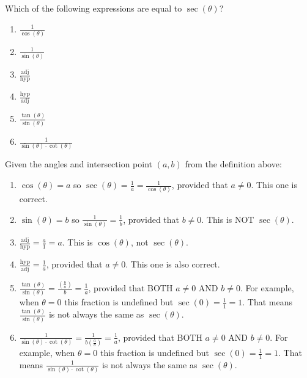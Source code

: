 \documentclass[nooutcomes]{ximera}
\begin{document}
\begin{example}
  Which of the following expressions are equal to $\sec(\theta)$?
  \begin{enumerate}
    \item{$\frac{1}{\cos(\theta)}$}
    \item{$\frac{1}{\sin(\theta)}$}
    \item{$\frac{\text{adj}}{\text{hyp}}$}
    \item{$\frac{\text{hyp}}{\text{adj}}$}
    \item{$\frac{\tan(\theta)}{\sin(\theta)}$}
    \item{$\frac{1}{\sin(\theta)\cdot\cot(\theta)}$}
  \end{enumerate}
  
	  \begin{explanation}
		Given the angles and intersection point $(a,b)$ from the definition above:
		  \begin{enumerate}
		    \item $\cos(\theta) = a$ so $\sec(\theta) = \frac{1}{a} = \frac{1}{\cos(\theta)}$, provided that $a \neq 0$. This one is correct.
		    \item $\sin(\theta) = b$ so $\frac{1}{\sin(\theta)} = \frac{1}{b}$, provided that $b \neq 0$. This is NOT $\sec(\theta)$.
		    \item $\frac{\text{adj}}{\text{hyp}} = \frac{a}{1}=a$. This is $\cos(\theta)$, not $\sec(\theta)$.
		    \item{$\frac{\text{hyp}}{\text{adj}} = \frac{1}{a}$, provided that $a \neq 0$. This one is also correct.}
		    \item $\frac{\tan(\theta)}{\sin(\theta)} = \frac{\left(\frac{b}{a}\right)}{b} = \frac{1}{a}$, provided that BOTH $a \neq 0$ AND $b\neq 0$. For example,
		    		when $\theta = 0$ this fraction is undefined but $\sec(0) = \frac{1}{1} = 1$. That means $\frac{\tan(\theta)}{\sin(\theta)}$ is
		    		not always the same as $\sec(\theta)$.
		    \item $\frac{1}{\sin(\theta)\cdot\cot(\theta)} = \frac{1}{b \left(\frac{a}{b}\right)} = \frac{1}{a}$, provided that BOTH $a \neq 0$ AND $b\neq 0$. For example,
		    		when $\theta = 0$ this fraction is undefined but $\sec(0) = \frac{1}{1} = 1$. That means $\frac{1}{\sin(\theta)\cdot\cot(\theta)}$ is not
		    		always the same as $\sec(\theta)$.
		  \end{enumerate} 	
	  \end{explanation}
\end{example}
\end{document}
